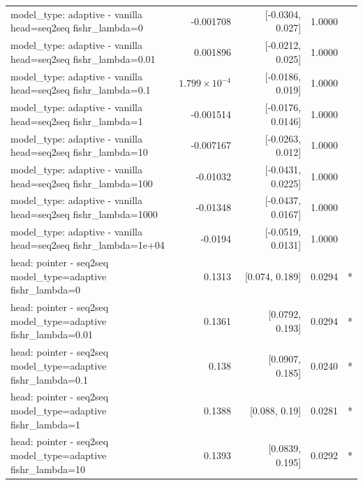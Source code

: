 \documentclass[10pt]{article}
\makeatletter
\newcommand{\stackcell}[1]{\begin{tabular}[t]{@{}l@{}}#1\end{tabular}}
\makeatother
\begin{document}
{\begin{longtable}{lrrrl}
\stackcell{model\_type: adaptive - vanilla\\\footnotesize head=seq2seq fishr\_lambda=0 } & -0.001708 & [-0.0304, 0.027] & 1.0000 & \\
\stackcell{model\_type: adaptive - vanilla\\\footnotesize head=seq2seq fishr\_lambda=0.01 } & 0.001896 & [-0.0212, 0.025] & 1.0000 & \\
\stackcell{model\_type: adaptive - vanilla\\\footnotesize head=seq2seq fishr\_lambda=0.1 } & $1.799\times10^{-4}$ & [-0.0186, 0.019] & 1.0000 & \\
\stackcell{model\_type: adaptive - vanilla\\\footnotesize head=seq2seq fishr\_lambda=1 } & -0.001514 & [-0.0176, 0.0146] & 1.0000 & \\
\stackcell{model\_type: adaptive - vanilla\\\footnotesize head=seq2seq fishr\_lambda=10 } & -0.007167 & [-0.0263, 0.012] & 1.0000 & \\
\stackcell{model\_type: adaptive - vanilla\\\footnotesize head=seq2seq fishr\_lambda=100 } & -0.01032 & [-0.0431, 0.0225] & 1.0000 & \\
\stackcell{model\_type: adaptive - vanilla\\\footnotesize head=seq2seq fishr\_lambda=1000 } & -0.01348 & [-0.0437, 0.0167] & 1.0000 & \\
\stackcell{model\_type: adaptive - vanilla\\\footnotesize head=seq2seq fishr\_lambda=1e+04 } & -0.0194 & [-0.0519, 0.0131] & 1.0000 & \\
\stackcell{head: pointer - seq2seq\\\footnotesize model\_type=adaptive fishr\_lambda=0 } & 0.1313 & [0.074, 0.189] & 0.0294 & *\\
\stackcell{head: pointer - seq2seq\\\footnotesize model\_type=adaptive fishr\_lambda=0.01 } & 0.1361 & [0.0792, 0.193] & 0.0294 & *\\
\stackcell{head: pointer - seq2seq\\\footnotesize model\_type=adaptive fishr\_lambda=0.1 } & 0.138 & [0.0907, 0.185] & 0.0240 & *\\
\stackcell{head: pointer - seq2seq\\\footnotesize model\_type=adaptive fishr\_lambda=1 } & 0.1388 & [0.088, 0.19] & 0.0281 & *\\
\stackcell{head: pointer - seq2seq\\\footnotesize model\_type=adaptive fishr\_lambda=10 } & 0.1393 & [0.0839, 0.195] & 0.0292 & *\\

\end{longtable}}
\end{document}
